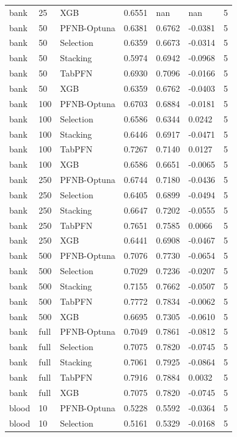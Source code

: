 \begin{tabular}{llllllr}
bank & 25 & XGB & 0.6551 & nan & nan & 5 \\
bank & 50 & PFNB-Optuna & 0.6381 & 0.6762 & -0.0381 & 5 \\
bank & 50 & Selection & 0.6359 & 0.6673 & -0.0314 & 5 \\
bank & 50 & Stacking & 0.5974 & 0.6942 & -0.0968 & 5 \\
bank & 50 & TabPFN & 0.6930 & 0.7096 & -0.0166 & 5 \\
bank & 50 & XGB & 0.6359 & 0.6762 & -0.0403 & 5 \\
bank & 100 & PFNB-Optuna & 0.6703 & 0.6884 & -0.0181 & 5 \\
bank & 100 & Selection & 0.6586 & 0.6344 & 0.0242 & 5 \\
bank & 100 & Stacking & 0.6446 & 0.6917 & -0.0471 & 5 \\
bank & 100 & TabPFN & 0.7267 & 0.7140 & 0.0127 & 5 \\
bank & 100 & XGB & 0.6586 & 0.6651 & -0.0065 & 5 \\
bank & 250 & PFNB-Optuna & 0.6744 & 0.7180 & -0.0436 & 5 \\
bank & 250 & Selection & 0.6405 & 0.6899 & -0.0494 & 5 \\
bank & 250 & Stacking & 0.6647 & 0.7202 & -0.0555 & 5 \\
bank & 250 & TabPFN & 0.7651 & 0.7585 & 0.0066 & 5 \\
bank & 250 & XGB & 0.6441 & 0.6908 & -0.0467 & 5 \\
bank & 500 & PFNB-Optuna & 0.7076 & 0.7730 & -0.0654 & 5 \\
bank & 500 & Selection & 0.7029 & 0.7236 & -0.0207 & 5 \\
bank & 500 & Stacking & 0.7155 & 0.7662 & -0.0507 & 5 \\
bank & 500 & TabPFN & 0.7772 & 0.7834 & -0.0062 & 5 \\
bank & 500 & XGB & 0.6695 & 0.7305 & -0.0610 & 5 \\
bank & full & PFNB-Optuna & 0.7049 & 0.7861 & -0.0812 & 5 \\
bank & full & Selection & 0.7075 & 0.7820 & -0.0745 & 5 \\
bank & full & Stacking & 0.7061 & 0.7925 & -0.0864 & 5 \\
bank & full & TabPFN & 0.7916 & 0.7884 & 0.0032 & 5 \\
bank & full & XGB & 0.7075 & 0.7820 & -0.0745 & 5 \\
blood & 10 & PFNB-Optuna & 0.5228 & 0.5592 & -0.0364 & 5 \\
blood & 10 & Selection & 0.5161 & 0.5329 & -0.0168 & 5 \\

\end{tabular}
